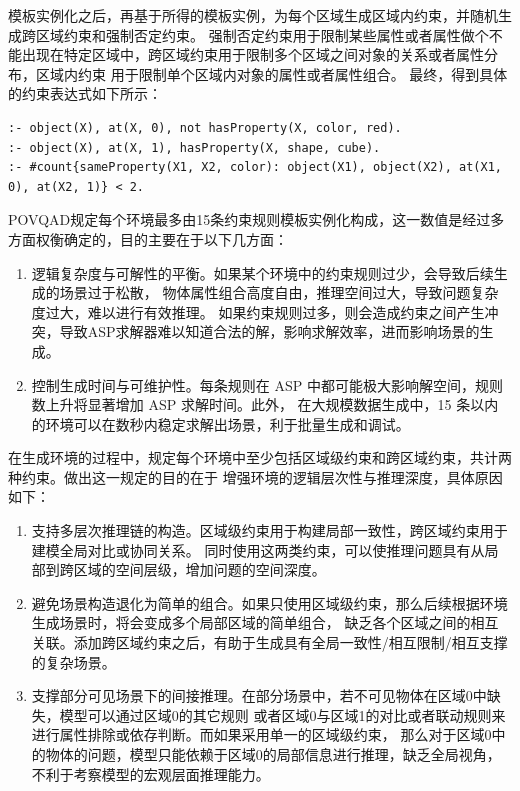 模板实例化之后，再基于所得的模板实例，为每个区域生成区域内约束，并随机生成跨区域约束和强制否定约束。
强制否定约束用于限制某些属性或者属性做个不能出现在特定区域中，跨区域约束用于限制多个区域之间对象的关系或者属性分布，区域内约束
用于限制单个区域内对象的属性或者属性组合。
最终，得到具体的约束表达式如下所示：
\begin{lstlisting}
:- object(X), at(X, 0), not hasProperty(X, color, red).
:- object(X), at(X, 1), hasProperty(X, shape, cube).
:- #count{sameProperty(X1, X2, color): object(X1), object(X2), at(X1, 0), at(X2, 1)} < 2.
\end{lstlisting}

POVQAD规定每个环境最多由15条约束规则模板实例化构成，这一数值是经过多方面权衡确定的，目的主要在于以下几方面：
\begin{enumerate}[nosep]
\item 逻辑复杂度与可解性的平衡。如果某个环境中的约束规则过少，会导致后续生成的场景过于松散，
物体属性组合高度自由，推理空间过大，导致问题复杂度过大，难以进行有效推理。
如果约束规则过多，则会造成约束之间产生冲突，导致ASP求解器难以知道合法的解，影响求解效率，进而影响场景的生成。
\item 控制生成时间与可维护性。每条规则在 ASP 中都可能极大影响解空间，规则数上升将显著增加 ASP 求解时间。此外，
在大规模数据生成中，15 条以内的环境可以在数秒内稳定求解出场景，利于批量生成和调试。
\end{enumerate}

在生成环境的过程中，规定每个环境中至少包括区域级约束和跨区域约束，共计两种约束。做出这一规定的目的在于
增强环境的逻辑层次性与推理深度，具体原因如下：
\begin{enumerate}[nosep]
\item 支持多层次推理链的构造。区域级约束用于构建局部一致性，跨区域约束用于建模全局对比或协同关系。
同时使用这两类约束，可以使推理问题具有从局部到跨区域的空间层级，增加问题的空间深度。
\item 避免场景构造退化为简单的组合。如果只使用区域级约束，那么后续根据环境生成场景时，将会变成多个局部区域的简单组合，
缺乏各个区域之间的相互关联。添加跨区域约束之后，有助于生成具有全局一致性/相互限制/相互支撑的复杂场景。
\item 支撑部分可见场景下的间接推理。在部分场景中，若不可见物体在区域0中缺失，模型可以通过区域0的其它规则
或者区域0与区域1的对比或者联动规则来进行属性排除或依存判断。而如果采用单一的区域级约束，
那么对于区域0中的物体的问题，模型只能依赖于区域0的局部信息进行推理，缺乏全局视角，不利于考察模型的宏观层面推理能力。
\end{enumerate}

